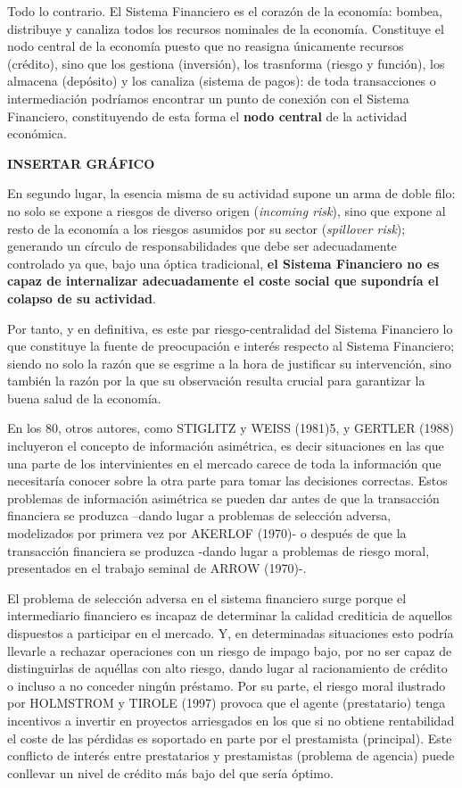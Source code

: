 \documentclass[10pt,a4paper]{article}
\begin{document}
Todo lo contrario. El Sistema Financiero es el corazón de la economía: bombea, distribuye y canaliza todos los recursos nominales de la economía. Constituye el nodo central de la economía puesto que no reasigna únicamente recursos (crédito), sino que los gestiona (inversión), los trasnforma (riesgo y función), los almacena (depósito) y los canaliza (sistema de pagos): de toda transacciones o intermediación podríamos encontrar un punto de conexión con el Sistema Financiero, constituyendo de esta forma el \textbf{nodo central} de la actividad económica.

\textbf{INSERTAR GRÁFICO}

En segundo lugar, la esencia misma de su actividad supone un arma de doble filo: no solo se expone a riesgos de diverso origen (\textit{incoming risk}), sino que expone al resto de la economía a los riesgos asumidos por su sector (\textit{spillover risk}); generando un círculo de responsabilidades que debe ser adecuadamente controlado ya que, bajo una óptica tradicional, \textbf{el Sistema Financiero no es capaz de internalizar adecuadamente el coste social que supondría el colapso de su actividad}.

Por tanto, y en definitiva, es este par riesgo-centralidad del Sistema Financiero lo que constituye la fuente de preocupación e interés respecto al Sistema Financiero; siendo no solo la razón que se esgrime a la hora de justificar su intervención, sino también la razón por la que su observación resulta crucial para garantizar la buena salud de la economía.

En los 80, otros autores, como STIGLITZ y WEISS (1981)5, y GERTLER (1988) incluyeron el concepto de información asimétrica, es decir situaciones en las que una parte de los intervinientes en el mercado carece de toda la información que necesitaría conocer sobre la otra parte para tomar las decisiones correctas. Estos problemas de información asimétrica se pueden dar antes de que la transacción financiera se produzca –dando lugar a problemas de selección adversa, modelizados por primera vez por AKERLOF (1970)- o después de que la transacción financiera se produzca -dando lugar a problemas de riesgo moral, presentados en el trabajo seminal de ARROW (1970)-.

El problema de selección adversa en el sistema financiero surge porque el intermediario financiero es incapaz de determinar la calidad crediticia de aquellos dispuestos a participar en el mercado. Y, en determinadas situaciones esto podría llevarle a rechazar operaciones con un riesgo de impago bajo, por no ser capaz de distinguirlas de aquéllas con alto riesgo, dando lugar al racionamiento de crédito o incluso a no conceder ningún préstamo. Por su parte, el riesgo moral ilustrado por HOLMSTROM y TIROLE (1997) provoca que el agente (prestatario) tenga incentivos a invertir en proyectos arriesgados en los que si no obtiene rentabilidad el coste de las pérdidas es soportado en parte por el prestamista (principal). Este conflicto de interés entre prestatarios y prestamistas (problema de agencia) puede conllevar un nivel de crédito más bajo del que sería óptimo.
\end{document}
